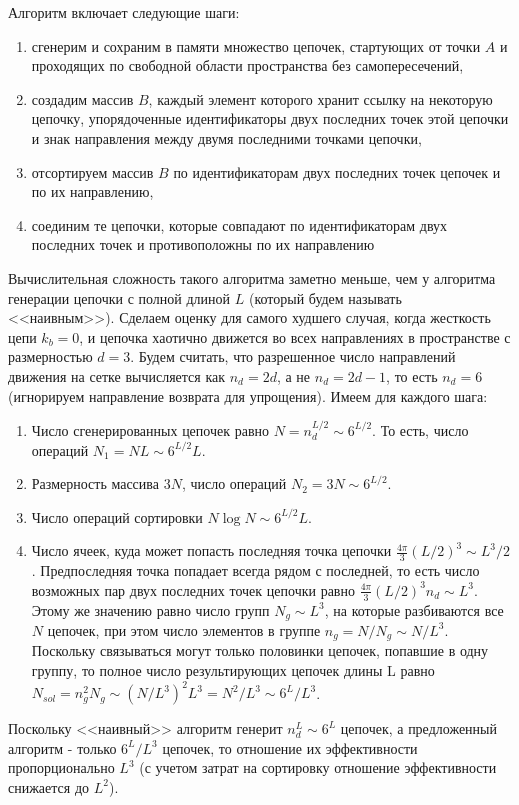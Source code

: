 \documentclass[tikz,a4paper]{scrartcl} %
\begin{document}
Алгоритм включает следующие шаги:
\begin{enumerate}
\item сгенерим и сохраним в памяти множество цепочек, стартующих от точки $A$ и проходящих по свободной области пространства без самопересечений,
\item создадим массив $B$, каждый элемент которого хранит ссылку на некоторую цепочку, упорядоченные идентификаторы двух последних точек этой цепочки и знак направления между двумя последними точками цепочки,
\item отсортируем массив $B$ по идентификаторам двух последних точек цепочек и по их направлению,
\item соединим те цепочки, которые совпадают по идентификаторам двух последних точек и противоположны по их направлению
\end{enumerate}

Вычислительная сложность такого алгоритма заметно меньше, чем у алгоритма генерации цепочки с полной длиной $L$ (который будем называть <<наивным>>). Сделаем оценку для самого худшего случая, когда жесткость цепи $k_b=0$, и цепочка хаотично движется во всех направлениях в пространстве с размерностью $d=3$. Будем считать, что разрешенное число направлений движения на сетке вычисляется как $n_d = 2d$, а не $n_d = 2d-1$, то есть $n_d =6$ (игнорируем направление возврата для упрощения). Имеем для каждого шага: 
\begin{enumerate}
\item Число сгенерированных цепочек равно $N = n_d^{L/2} \sim 6^{L/2}$. То есть, число операций $N_1 = N L \sim 6^{L/2} L$.
\item Размерность массива $3 N$, число операций $N_2 = 3 N \sim 6^{L/2}$.
\item Число операций сортировки $N \log N \sim 6^{L/2} L$.
\item Число ячеек, куда может попасть последняя точка цепочки $\frac{4\pi}{3}(L/2)^3 \sim L^3/2$. Предпоследняя точка попадает всегда рядом с последней, то есть число возможных пар двух последних точек цепочки равно $\frac{4\pi}{3}(L/2)^3 n_d \sim L^3$. Этому же значению равно число групп $N_g \sim L^3$, на которые разбиваются все $N$ цепочек, при этом число элементов в группе $n_g = N/N_g \sim N/ L^3$. Поскольку связываться могут только половинки цепочек, попавшие в одну группу, то полное число результирующих цепочек длины L равно $N_{sol} = n_g^2 N_g \sim (N/L^3)^2 L^3 = N^2 / L^3 \sim 6^L / L^3$.
\end{enumerate}
Поскольку <<наивный>> алгоритм генерит $n_d^L \sim 6^L$ цепочек, а предложенный алгоритм - только $6^L / L^3$ цепочек, то отношение их эффективности пропорционально $L^3$ (с учетом затрат на сортировку отношение эффективности снижается до $L^2$).
\end{document}
